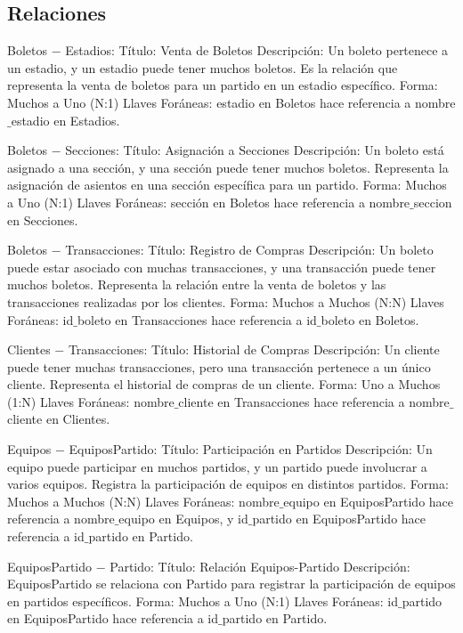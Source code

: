 \subsection*{Relaciones}

Boletos $-$ Estadios:
Título: Venta de Boletos
Descripción: Un boleto pertenece a un estadio, y un estadio puede tener muchos boletos. Es la relación que representa la venta de boletos para un partido en un estadio específico.
Forma: Muchos a Uno (N:1)
Llaves Foráneas: estadio en Boletos hace referencia a nombre$\_$estadio en Estadios.

Boletos $-$ Secciones:
Título: Asignación a Secciones
Descripción: Un boleto está asignado a una sección, y una sección puede tener muchos boletos. Representa la asignación de asientos en una sección específica para un partido.
Forma: Muchos a Uno (N:1)
Llaves Foráneas: sección en Boletos hace referencia a nombre$\_$seccion en Secciones.

Boletos $-$ Transacciones:
Título: Registro de Compras
Descripción: Un boleto puede estar asociado con muchas transacciones, y una transacción puede tener muchos boletos. Representa la relación entre la venta de boletos y las transacciones realizadas por los clientes.
Forma: Muchos a Muchos (N:N)
Llaves Foráneas: id$\_$boleto en Transacciones hace referencia a id$\_$boleto en Boletos.

Clientes $-$ Transacciones:
Título: Historial de Compras
Descripción: Un cliente puede tener muchas transacciones, pero una transacción pertenece a un único cliente. Representa el historial de compras de un cliente.
Forma: Uno a Muchos (1:N)
Llaves Foráneas: nombre$\_$cliente en Transacciones hace referencia a nombre$\_$cliente en Clientes.

Equipos $-$ EquiposPartido:
Título: Participación en Partidos
Descripción: Un equipo puede participar en muchos partidos, y un partido puede involucrar a varios equipos. Registra la participación de equipos en distintos partidos.
Forma: Muchos a Muchos (N:N)
Llaves Foráneas: nombre$\_$equipo en EquiposPartido hace referencia a nombre$\_$equipo en Equipos, y id$\_$partido en EquiposPartido hace referencia a id$\_$partido en Partido.


EquiposPartido $-$ Partido:
Título: Relación Equipos-Partido
Descripción: EquiposPartido se relaciona con Partido para registrar la participación de equipos en partidos específicos.
Forma: Muchos a Uno (N:1)
Llaves Foráneas: id$\_$partido en EquiposPartido hace referencia a id$\_$partido en Partido.


